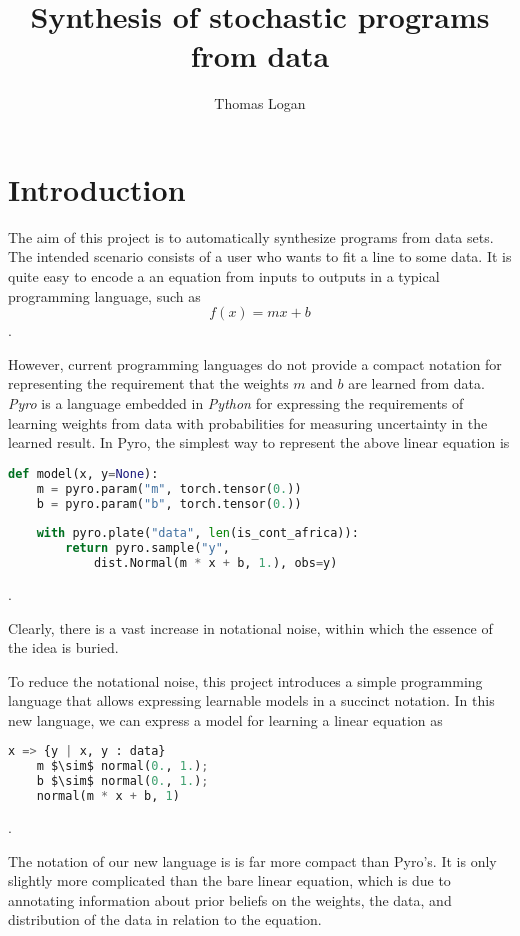 \documentclass[runningheads]{llncs}
\title{Synthesis of stochastic programs from data}
\author{Thomas Logan}
\institute{University of Texas at Austin}
\begin{document}
\maketitle

\section{Introduction}
The aim of this project is to automatically synthesize  programs from data sets. 
The intended scenario consists of a user who wants to fit a line to some data.
It is quite easy to encode a an equation
from inputs to outputs in a typical programming language, such as 
\[ f(x) = m x + b \] 
.

However, current programming languages do not provide a compact notation 
for representing the requirement that the weights $m$ and $b$ are learned from data.
\textit{Pyro} \cite{} is a language embedded in \textit{Python} \cite{} for 
expressing the requirements of learning weights from data 
with probabilities for measuring uncertainty in the learned result. 
In Pyro, the simplest way to represent the above linear equation is 

\begin{lstlisting}[language=Python]
def model(x, y=None):
    m = pyro.param("m", torch.tensor(0.))
    b = pyro.param("b", torch.tensor(0.))
    
    with pyro.plate("data", len(is_cont_africa)):
        return pyro.sample("y", 
            dist.Normal(m * x + b, 1.), obs=y)
\end{lstlisting}
.

Clearly, there is a vast increase in notational noise, within which the essence of the idea is buried. 

To reduce the notational noise, this project introduces a simple programming language 
that allows expressing learnable models in a succinct notation. In this new language,
we can express a model for learning a linear equation as 

\begin{lstlisting}[language=Python]
x => {y | x, y : data}
    m $\sim$ normal(0., 1.); 
    b $\sim$ normal(0., 1.); 
    normal(m * x + b, 1)
\end{lstlisting}
.

The notation of our new language is is far more compact than Pyro's. 
It is only slightly more complicated than the bare linear equation, which is
due to annotating information about prior beliefs on the weights, the data, and 
distribution of the data in relation to the equation. 
\end{document}
